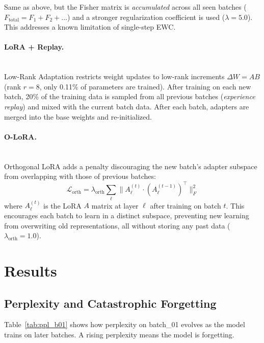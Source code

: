 \documentclass[11pt,a4paper]{article}
\begin{document}
Same as above, but the Fisher matrix is \textit{accumulated} across all seen batches ($F_{\text{total}} = F_1 + F_2 + \ldots$) and a stronger regularization coefficient is used ($\lambda = 5.0$). This addresses a known limitation of single-step EWC.

\paragraph{LoRA + Replay.} \mbox{}\\

Low-Rank Adaptation \cite{hu2022lora} restricts weight updates to low-rank increments $\Delta W = AB$ (rank $r=8$, only 0.11\% of parameters are trained). After training on each new batch, 20\% of the training data is sampled from all previous batches (\textit{experience replay}) and mixed with the current batch data. After each batch, adapters are merged into the base weights and re-initialized.

\paragraph{O-LoRA.} \mbox{}\\

Orthogonal LoRA adds a penalty discouraging the new batch's adapter subspace from overlapping with those of previous batches:
\[
\mathcal{L}_{\text{orth}} = \lambda_{\text{orth}} \sum_{\ell} \| A_{\ell}^{(t)} \cdot (A_{\ell}^{(t-1)})^\top \|_F^2
\]
where $A_{\ell}^{(t)}$ is the LoRA $A$ matrix at layer $\ell$ after training on batch $t$. This encourages each batch to learn in a distinct subspace, preventing new learning from overwriting old representations, all without storing any past data ($\lambda_{\text{orth}} = 1.0$).

\section{Results}

\subsection{Perplexity and Catastrophic Forgetting}

Table~\ref{tab:ppl_b01} shows how perplexity on batch\_01 evolves as the model trains on later batches. A rising perplexity means the model is forgetting.
\end{document}
